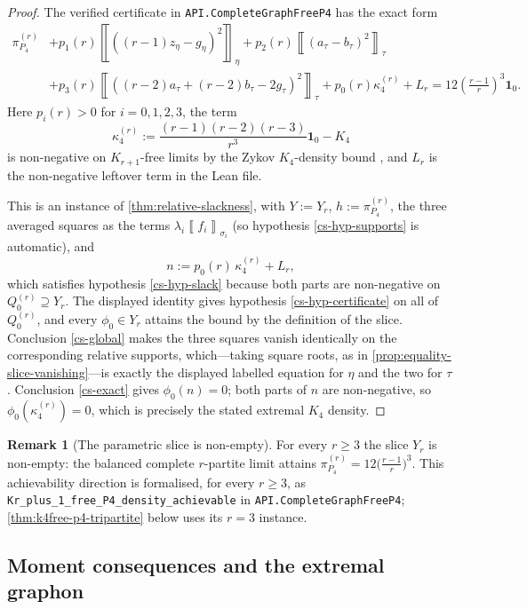 \documentclass[11pt]{article}
\theoremstyle{definition}
\newtheorem{remark}[remark]{Remark}
\newcommand{\avg}[2]{\left\llbracket #1 \right\rrbracket_{#2}}
\newcommand{\one}{\mathbf 1}
\begin{document}
\begin{proof}
The verified certificate in \texttt{API.CompleteGraphFreeP4} has the exact form
\[
\begin{aligned}
  \pi_{P_4}^{(r)}
  &+p_1(r)\avg{((r-1)z_\eta-g_\eta)^2}{\eta}
   +p_2(r)\avg{(a_\tau-b_\tau)^2}{\tau} \\
  &+p_3(r)\avg{((r-2)a_\tau+(r-2)b_\tau-2g_\tau)^2}{\tau}
   +p_0(r)\kappa_4^{(r)}
   +L_r
   =
   12\left(\frac{r-1}{r}\right)^3\one_0 .
\end{aligned}
\]
Here $p_i(r)>0$ for $i=0,1,2,3$, the term
\[
  \kappa_4^{(r)}
  :=
  \frac{(r-1)(r-2)(r-3)}{r^3}\one_0-K_4
\]
is non-negative on $K_{r+1}$-free limits by the Zykov $K_4$-density bound
\cite{Zykov1949}, and
$L_r$ is the non-negative leftover term in the Lean file.

This is an instance of \cref{thm:relative-slackness}, with $Y:=Y_r$,
$h:=\pi_{P_4}^{(r)}$, the three averaged squares as the terms
$\lambda_i\avg{f_i}{\sigma_i}$ (so hypothesis \ref{cs-hyp-supports} is automatic), and
\[
  n:=p_0(r)\,\kappa_4^{(r)}+L_r,
\]
which satisfies hypothesis \ref{cs-hyp-slack} because both parts are non-negative on
$Q_0^{(r)}\supseteq Y_r$.  The displayed identity gives hypothesis
\ref{cs-hyp-certificate} on all of $Q_0^{(r)}$, and every $\phi_0\in Y_r$ attains the
bound by the definition of the slice.  Conclusion \ref{cs-global} makes the three squares
vanish identically on the corresponding relative supports, which---taking square roots,
as in \cref{prop:equality-slice-vanishing}---is exactly the displayed labelled equation
for $\eta$ and the two for $\tau$.  Conclusion \ref{cs-exact} gives $\phi_0(n)=0$; both
parts of $n$ are non-negative, so $\phi_0(\kappa_4^{(r)})=0$, which is precisely the
stated extremal $K_4$ density.
\end{proof}

\begin{remark}[The parametric slice is non-empty]\label{rem:parametric-nonempty}
For every $r\ge3$ the slice $Y_r$ is non-empty: the balanced complete $r$-partite limit
attains $\pi_{P_4}^{(r)}=12\bigl(\frac{r-1}r\bigr)^3$.  This achievability direction is
formalised, for every $r\ge3$, as
\texttt{Kr\_plus\_1\_free\_P4\_density\_achievable} in
\texttt{API.CompleteGraphFreeP4}; \cref{thm:k4free-p4-tripartite} below uses its $r=3$
instance.
\end{remark}

\subsection{Moment consequences and the extremal graphon}
\end{document}
